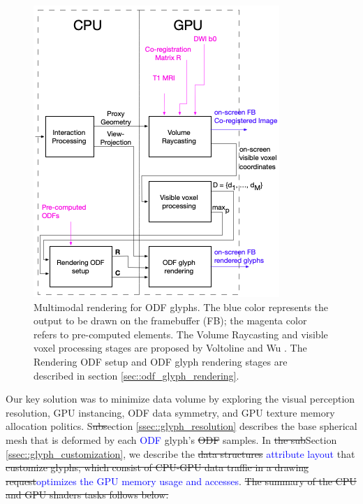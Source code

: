 \documentclass[twoside,twocolumn,10pt]{article}
\begin{document}
\begin{figure}[ht]
    \centering
    \includegraphics[width=1.0\linewidth, angle=0]{figs/rendering_scheme/fluxograma_glifosVMTK_4.png}
    \caption{Multimodal rendering for ODF glyphs. The blue color represents the output to be drawn on the framebuffer (FB); the magenta color refers to pre-computed elements. The Volume Raycasting and visible voxel processing stages are proposed by Voltoline and Wu \cite{voltoline2021}. The Rendering ODF setup and ODF glyph rendering stages are described in section \ref{sec::odf_glyph_rendering}.}
    \label{fig::vmtk_simplified}
\end{figure}

Our key solution was to minimize data volume by exploring the visual perception resolution, GPU instancing, ODF data symmetry, and GPU texture memory allocation politics. S\sout{ubs}ection \ref{ssec::glyph_resolution} describes the base spherical mesh that is deformed by each \textcolor{blue}{ODF} glyph's \sout{ODF} samples. In \sout{the sub}Section \ref{ssec::glyph_customization}, we describe the \sout{data structures} \textcolor{blue}{attribute layout} that \sout{customize glyphs, which consist of CPU-GPU data traffic in a drawing request}\textcolor{blue}{optimizes the GPU memory usage and accesses}. \sout{The summary of the CPU and GPU shaders tasks follows below.}
\end{document}
